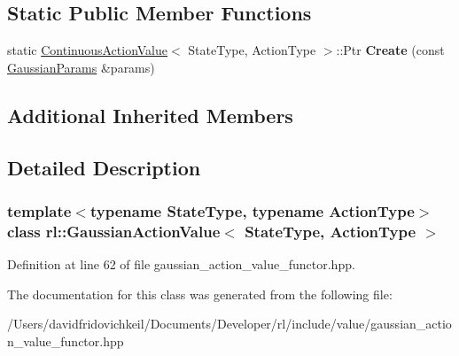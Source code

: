 \subsection*{Static Public Member Functions}
\begin{DoxyCompactItemize}
\item 
\hypertarget{classrl_1_1_gaussian_action_value_a1014a288fa074d5a09c49581a739ba17}{}\label{classrl_1_1_gaussian_action_value_a1014a288fa074d5a09c49581a739ba17} 
static \hyperlink{classrl_1_1_continuous_action_value}{Continuous\+Action\+Value}$<$ State\+Type, Action\+Type $>$\+::Ptr {\bfseries Create} (const \hyperlink{structrl_1_1_gaussian_params}{Gaussian\+Params} \&params)
\end{DoxyCompactItemize}
\subsection*{Additional Inherited Members}


\subsection{Detailed Description}
\subsubsection*{template$<$typename State\+Type, typename Action\+Type$>$\newline
class rl\+::\+Gaussian\+Action\+Value$<$ State\+Type, Action\+Type $>$}



Definition at line 62 of file gaussian\+\_\+action\+\_\+value\+\_\+functor.\+hpp.



The documentation for this class was generated from the following file\+:\begin{DoxyCompactItemize}
\item 
/\+Users/davidfridovichkeil/\+Documents/\+Developer/rl/include/value/gaussian\+\_\+action\+\_\+value\+\_\+functor.\+hpp\end{DoxyCompactItemize}
